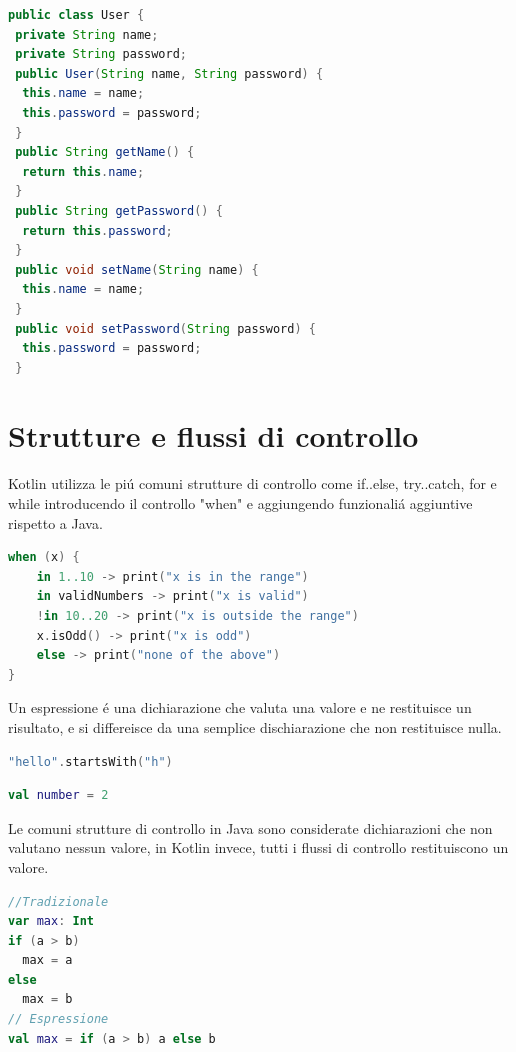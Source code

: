 \begin{lstlisting}[language=java,caption={Esempio classe Java}]
public class User {
 private String name;
 private String password;
 public User(String name, String password) {
  this.name = name;
  this.password = password;
 }
 public String getName() {
  return this.name;
 }
 public String getPassword() {
  return this.password;
 }
 public void setName(String name) {
  this.name = name;
 }
 public void setPassword(String password) {
  this.password = password;
 }
\end{lstlisting}




\section{Strutture e flussi di controllo}
Kotlin utilizza le pi\'u comuni strutture di controllo come if..else, try..catch, for e while introducendo il controllo "when" e aggiungendo funzionali\'a aggiuntive rispetto a Java.

\begin{lstlisting}[language=kotlin,caption={When kotlin}]
when (x) {
    in 1..10 -> print("x is in the range")
    in validNumbers -> print("x is valid")
    !in 10..20 -> print("x is outside the range")
    x.isOdd() -> print("x is odd")
    else -> print("none of the above")
}
\end{lstlisting}


Un espressione \'e una dichiarazione che valuta una valore e ne restituisce un risultato, e si differeisce da una semplice dischiarazione che non restituisce nulla.

\begin{lstlisting}[language=kotlin,caption={Espressione}]
"hello".startsWith("h")
\end{lstlisting}

\begin{lstlisting}[language=kotlin,caption={Dischiarazione}]
val number = 2
\end{lstlisting}

Le comuni strutture di controllo in Java sono considerate dichiarazioni che non valutano nessun valore, in Kotlin invece, tutti i flussi di controllo restituiscono un valore.

\begin{lstlisting}[language=kotlin,caption={esempio espresioni kotlin}]
//Tradizionale
var max: Int
if (a > b)
  max = a
else
  max = b
// Espressione
val max = if (a > b) a else b
\end{lstlisting}


